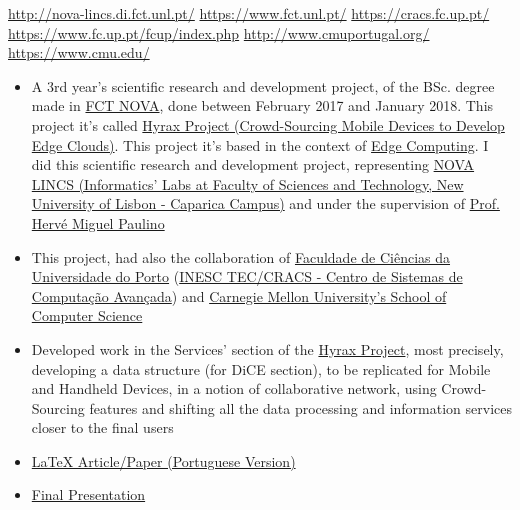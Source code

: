 \documentclass[10pt,a4paper,academicons]{altacv}
\begin{document}
{\href{http://nova-lincs.di.fct.unl.pt/}{http://nova-lincs.di.fct.unl.pt/}\hspace{2em} \faGlobe\hspace{0.5em}\href{https://www.fct.unl.pt/}{https://www.fct.unl.pt/}}
{\href{https://cracs.fc.up.pt/}{https://cracs.fc.up.pt/}\hspace{2em} \faGlobe\hspace{0.5em}\href{https://www.fc.up.pt/fcup/index.php}{https://www.fc.up.pt/fcup/index.php}}
{\href{http://www.cmuportugal.org/}{http://www.cmuportugal.org/}\hspace{2em} \faGlobe\hspace{0.5em}\href{https://www.cmu.edu/}{https://www.cmu.edu/}}{}
\begin{itemize}
\item A 3rd year's scientific research and development project, of the BSc. degree made in \href{https://www.fct.unl.pt/}{FCT NOVA}, done between February 2017 and January 2018. This project it's called \href{http://hyrax.dcc.fc.up.pt/}{Hyrax Project (Crowd-Sourcing Mobile Devices to Develop Edge Clouds)}. This project it's based in the context of \href{https://en.wikipedia.org/wiki/Edge_computing}{Edge Computing}. I did this scientific research and development project, representing \href{http://nova-lincs.di.fct.unl.pt/}{NOVA LINCS (Informatics' Labs at Faculty of Sciences and Technology, New University of Lisbon - Caparica Campus)} and under the supervision of \href{https://docentes.fct.unl.pt/p161/}{Prof. Hervé Miguel Paulino}
\item This project, had also the collaboration of \href{https://www.fc.up.pt/fcup/index.php}{Faculdade de Ciências da Universidade do Porto} (\href{https://cracs.fc.up.pt/}{INESC TEC/CRACS - Centro de Sistemas de Computação Avançada}) and \href{https://www.cmu.edu/}{Carnegie Mellon University's School of Computer Science}
\item Developed work in the Services' section of the \href{http://hyrax.dcc.fc.up.pt/}{Hyrax Project}, most precisely, developing a data structure (for DiCE section), to be replicated for Mobile and Handheld Devices, in a notion of collaborative network, using Crowd-Sourcing features and shifting all the data processing and information services closer to the final users
\item \href{https://rubenandrebarreiro.github.io/research-development/hyrax-dice/report-article/hyrax-dice-report-article.pdf}{LaTeX Article/Paper (Portuguese Version)}
\item \href{https://rubenandrebarreiro.github.io/research-development/hyrax-dice/presentation/hyrax-dice-presentation.pdf}{Final Presentation}
\end{itemize}
\end{document}
